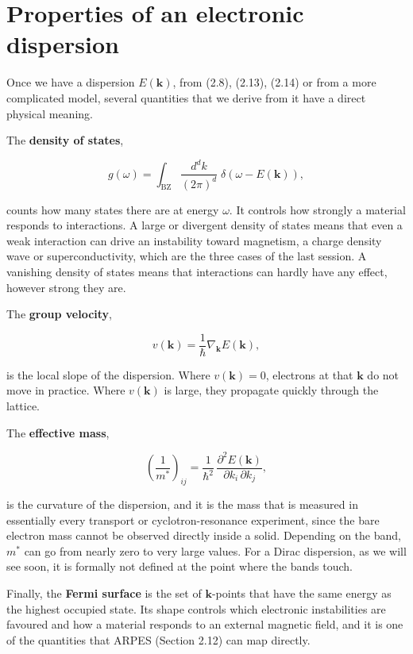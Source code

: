\section{Properties of an electronic dispersion}

Once we have a dispersion $E(\mathbf{k})$, from (2.8), (2.13), (2.14) or from a more complicated
model, several quantities that we derive from it have a direct physical meaning.

The \textbf{density of states},

\begin{equation}g(\omega) = \int_{\text{BZ}} \frac{d^dk}{(2\pi)^d}\; \delta\!\left(\omega-E(\mathbf{k})\right),
\end{equation}

counts how many states there are at energy $\omega$. It controls how strongly a material responds to
interactions. A large or divergent density of states means that even a weak interaction can drive an
instability toward magnetism, a charge density wave or superconductivity, which are the three cases
of the last session. A vanishing density of states means that interactions can hardly have any effect,
however strong they are.

The \textbf{group velocity},

\begin{equation}v(\mathbf{k}) = \frac{1}{\hbar}\nabla_{\mathbf{k}} E(\mathbf{k}),\end{equation}

is the local slope of the dispersion. Where $v(\mathbf{k})=0$, electrons at that $\mathbf{k}$ do not
move in practice. Where $v(\mathbf{k})$ is large, they propagate quickly through the lattice.

The \textbf{effective mass},

\begin{equation}\left(\frac{1}{m^\ast}\right)_{ij} = \frac{1}{\hbar^2}\,
\frac{\partial^2 E(\mathbf{k})}{\partial k_i\,\partial k_j},\end{equation}

is the curvature of the dispersion, and it is the mass that is measured in essentially every
transport or cyclotron-resonance experiment, since the bare electron mass cannot be observed directly
inside a solid. Depending on the band, $m^\ast$ can go from nearly zero to very large values. For a
Dirac dispersion, as we will see soon, it is formally not defined at the point where the bands touch.

Finally, the \textbf{Fermi surface} is the set of $\mathbf{k}$-points that have the same energy as
the highest occupied state. Its shape controls which electronic instabilities are favoured and how a
material responds to an external magnetic field, and it is one of the quantities that ARPES
(Section 2.12) can map directly.

